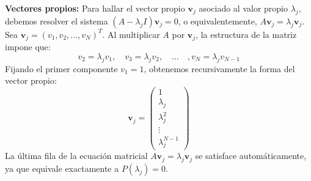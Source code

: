 {\begin{enumerate}
        \textbf{Vectores propios:}
        Para hallar el vector propio $\mathbf{v}_j$ asociado al valor propio $\lambda_j$, debemos resolver el sistema $(A - \lambda_j I)\mathbf{v}_j = 0$, o equivalentemente, $A\mathbf{v}_j = \lambda_j \mathbf{v}_j$. Sea $\mathbf{v}_j = (v_1, v_2, \dots, v_N)^T$. Al multiplicar $A$ por $\mathbf{v}_j$, la estructura de la matriz impone que:
        $$v_2 = \lambda_j v_1, \quad v_3 = \lambda_j v_2, \quad \dots \quad, v_N = \lambda_j v_{N-1}$$
        Fijando el primer componente $v_1 = 1$, obtenemos recursivamente la forma del vector propio:
        $$\mathbf{v}_j = \begin{pmatrix} 1 \\ \lambda_j \\ \lambda_j^2 \\ \vdots \\ \lambda_j^{N-1} \end{pmatrix}$$
        La última fila de la ecuación matricial $A\mathbf{v}_j = \lambda_j \mathbf{v}_j$ se satisface automáticamente, ya que equivale exactamente a $P(\lambda_j) = 0$.


\end{enumerate}}
